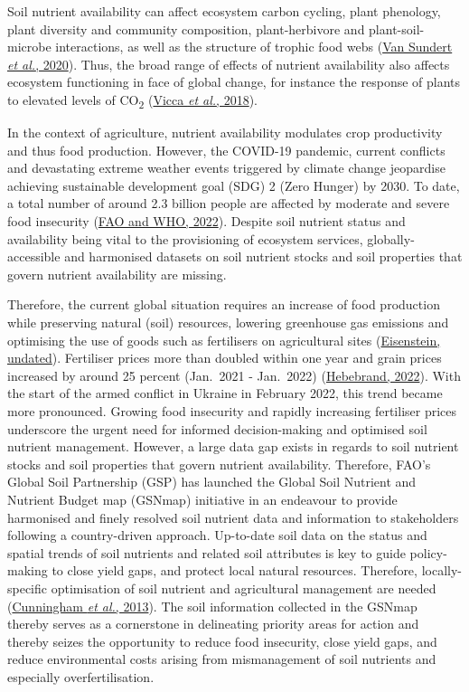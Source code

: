 \documentclass[
  10pt,
  b5paper,
  oneside]{book}
\begin{document}
Soil nutrient availability can affect ecosystem carbon cycling, plant phenology, plant diversity and community composition, plant-herbivore and plant-soil-microbe interactions, as well as the structure of trophic food webs (\protect\hyperlink{ref-vanSundert2020}{Van Sundert \emph{et al.}, 2020}). Thus, the broad range of effects of nutrient availability also affects ecosystem functioning in face of global change, for instance the response of plants to elevated levels of CO\textsubscript{2} (\protect\hyperlink{ref-vicca2018}{Vicca \emph{et al.}, 2018}).

In the context of agriculture, nutrient availability modulates crop productivity and thus food production. However, the COVID-19 pandemic, current conflicts and devastating extreme weather events triggered by climate change jeopardise achieving sustainable development goal (SDG) 2 (Zero Hunger) by 2030. To date, a total number of around 2.3 billion people are affected by moderate and severe food insecurity (\protect\hyperlink{ref-FAO2022}{FAO and WHO, 2022}). Despite soil nutrient status and availability being vital to the provisioning of ecosystem services, globally-accessible and harmonised datasets on soil nutrient stocks and soil properties that govern nutrient availability are missing.

Therefore, the current global situation requires an increase of food production while preserving natural (soil) resources, lowering greenhouse gas emissions and optimising the use of goods such as fertilisers on agricultural sites (\protect\hyperlink{ref-eisenstein2020}{Eisenstein, undated}). Fertiliser prices more than doubled within one year and grain prices increased by around 25 percent (Jan.~2021 - Jan.~2022) (\protect\hyperlink{ref-ifpri2020}{Hebebrand, 2022}). With the start of the armed conflict in Ukraine in February 2022, this trend became more pronounced.
Growing food insecurity and rapidly increasing fertiliser prices underscore the urgent need for informed decision-making and optimised soil nutrient management. However, a large data gap exists in regards to soil nutrient stocks and soil properties that govern nutrient availability. Therefore, FAO's Global Soil Partnership (GSP) has launched the Global Soil Nutrient and Nutrient Budget map (GSNmap) initiative in an endeavour to provide harmonised and finely resolved soil nutrient data and information to stakeholders following a country-driven approach.
Up-to-date soil data on the status and spatial trends of soil nutrients and related soil attributes is key to guide policy-making to close yield gaps, and protect local natural resources. Therefore, locally-specific optimisation of soil nutrient and agricultural management are needed (\protect\hyperlink{ref-cunningham2013}{Cunningham \emph{et al.}, 2013}). The soil information collected in the GSNmap thereby serves as a cornerstone in delineating priority areas for action and thereby seizes the opportunity to reduce food insecurity, close yield gaps, and reduce environmental costs arising from mismanagement of soil nutrients and especially overfertilisation.
\end{document}
